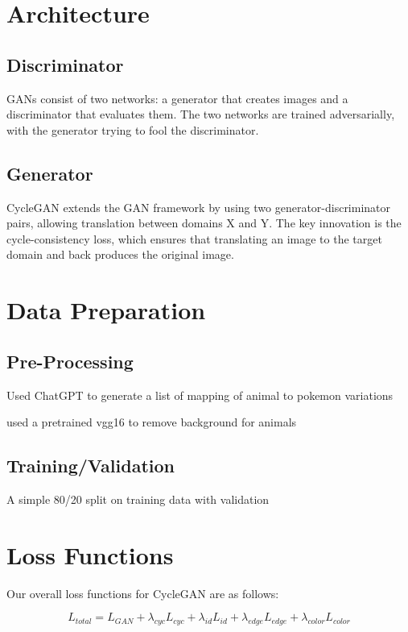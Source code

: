 \documentclass[twoside,english,notitlepage]{report}
\begin{document}
\section{Architecture}
\subsection{Discriminator}
GANs consist of two networks: a generator that creates images and a discriminator that evaluates them. The two networks are trained adversarially, with the generator trying to fool the discriminator.

\subsection{Generator}
CycleGAN extends the GAN framework by using two generator-discriminator pairs, allowing translation between domains X and Y. The key innovation is the cycle-consistency loss, which ensures that translating an image to the target domain and back produces the original image.


\section{Data Preparation}
\subsection{Pre-Processing}
Used ChatGPT to generate a list of mapping of animal to pokemon variations


used a pretrained vgg16 to remove background for animals



\subsection{Training/Validation}
A simple 80/20 split on training data with validation



\section{Loss Functions}
Our overall loss functions for CycleGAN are as follows:


\begin{equation}
    L_{total} = L_{GAN} + \lambda_{cyc} L_{cyc} + \lambda_{id} L_{id} + \lambda_{edge} L_{edge} + \lambda_{color} L_{color}
\end{equation}
\end{document}
